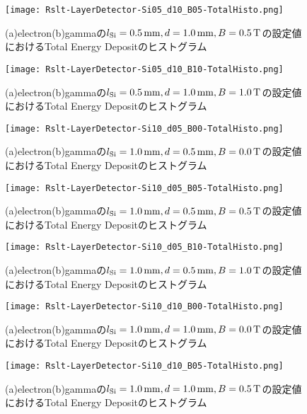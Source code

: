 \documentclass[a4paper,10pt]{jreport}
\begin{document}
\begin{figure}[H]
	\center
	\texttt{[image: Rslt-LayerDetector-Si05\_d10\_B05-TotalHisto.png]}
	\caption{(a)electron(b)gammaの$l_{\rm{Si}}=\SI{0.5}{mm}, d=\SI{1.0}{mm}, B=\SI{0.5}{T}$の設定値におけるTotal Energy Depositのヒストグラム}
	\label{Rslt-LayerDetector-Si05_d10_B05-TotalHisto}
\end{figure}

\begin{figure}[H]
	\center
	\texttt{[image: Rslt-LayerDetector-Si05\_d10\_B10-TotalHisto.png]}
	\caption{(a)electron(b)gammaの$l_{\rm{Si}}=\SI{0.5}{mm}, d=\SI{1.0}{mm}, B=\SI{1.0}{T}$の設定値におけるTotal Energy Depositのヒストグラム}
	\label{Rslt-LayerDetector-Si05_d10_B10-TotalHisto}
\end{figure}

\begin{figure}[H]
	\center
	\texttt{[image: Rslt-LayerDetector-Si10\_d05\_B00-TotalHisto.png]}
	\caption{(a)electron(b)gammaの$l_{\rm{Si}}=\SI{1.0}{mm}, d=\SI{0.5}{mm}, B=\SI{0.0}{T}$の設定値におけるTotal Energy Depositのヒストグラム}
	\label{Rslt-LayerDetector-Si10_d05_B00-TotalHisto}
\end{figure}

\begin{figure}[H]
	\center
	\texttt{[image: Rslt-LayerDetector-Si10\_d05\_B05-TotalHisto.png]}
	\caption{(a)electron(b)gammaの$l_{\rm{Si}}=\SI{1.0}{mm}, d=\SI{0.5}{mm}, B=\SI{0.5}{T}$の設定値におけるTotal Energy Depositのヒストグラム}
	\label{Rslt-LayerDetector-Si10_d05_B05-TotalHisto}
\end{figure}

\begin{figure}[H]
	\center
	\texttt{[image: Rslt-LayerDetector-Si10\_d05\_B10-TotalHisto.png]}
	\caption{(a)electron(b)gammaの$l_{\rm{Si}}=\SI{1.0}{mm}, d=\SI{0.5}{mm}, B=\SI{1.0}{T}$の設定値におけるTotal Energy Depositのヒストグラム}
	\label{Rslt-LayerDetector-Si10_d05_B10-TotalHisto}
\end{figure}

\begin{figure}[H]
	\center
	\texttt{[image: Rslt-LayerDetector-Si10\_d10\_B00-TotalHisto.png]}
	\caption{(a)electron(b)gammaの$l_{\rm{Si}}=\SI{1.0}{mm}, d=\SI{1.0}{mm}, B=\SI{0.0}{T}$の設定値におけるTotal Energy Depositのヒストグラム}
	\label{Rslt-LayerDetector-Si10_d10_B00-TotalHisto}
\end{figure}

\begin{figure}[H]
	\center
	\texttt{[image: Rslt-LayerDetector-Si10\_d10\_B05-TotalHisto.png]}
	\caption{(a)electron(b)gammaの$l_{\rm{Si}}=\SI{1.0}{mm}, d=\SI{1.0}{mm}, B=\SI{0.5}{T}$の設定値におけるTotal Energy Depositのヒストグラム}
	\label{Rslt-LayerDetector-Si10_d10_B05-TotalHisto}
\end{figure}
\end{document}
